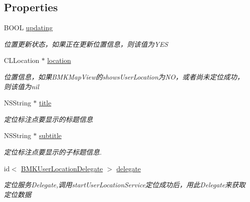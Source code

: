 \subsection*{Properties}
\begin{DoxyCompactItemize}
\item 
\hypertarget{interface_b_m_k_user_location_a57e486ccb3b7665183e9e1eaa4d2716e}{B\-O\-O\-L \hyperlink{interface_b_m_k_user_location_a57e486ccb3b7665183e9e1eaa4d2716e}{updating}}\label{interface_b_m_k_user_location_a57e486ccb3b7665183e9e1eaa4d2716e}

\begin{DoxyCompactList}\small\item\em 位置更新状态，如果正在更新位置信息，则该值为\-Y\-E\-S \end{DoxyCompactList}\item 
\hypertarget{interface_b_m_k_user_location_aba4b76e55f4605c5554fe16aca1b4fbf}{C\-L\-Location $\ast$ \hyperlink{interface_b_m_k_user_location_aba4b76e55f4605c5554fe16aca1b4fbf}{location}}\label{interface_b_m_k_user_location_aba4b76e55f4605c5554fe16aca1b4fbf}

\begin{DoxyCompactList}\small\item\em 位置信息，如果\-B\-M\-K\-Map\-View的shows\-User\-Location为\-N\-O，或者尚未定位成功，则该值为nil \end{DoxyCompactList}\item 
\hypertarget{interface_b_m_k_user_location_a8fc42845ec226a1af2de73c8dd4d183d}{N\-S\-String $\ast$ \hyperlink{interface_b_m_k_user_location_a8fc42845ec226a1af2de73c8dd4d183d}{title}}\label{interface_b_m_k_user_location_a8fc42845ec226a1af2de73c8dd4d183d}

\begin{DoxyCompactList}\small\item\em 定位标注点要显示的标题信息 \end{DoxyCompactList}\item 
\hypertarget{interface_b_m_k_user_location_af38d7aa4f89637da255ca7308fcaa240}{N\-S\-String $\ast$ \hyperlink{interface_b_m_k_user_location_af38d7aa4f89637da255ca7308fcaa240}{subtitle}}\label{interface_b_m_k_user_location_af38d7aa4f89637da255ca7308fcaa240}

\begin{DoxyCompactList}\small\item\em 定位标注点要显示的子标题信息. \end{DoxyCompactList}\item 
\hypertarget{interface_b_m_k_user_location_ae9eee8d2d4760509e448b1f3b90d3a61}{id$<$ \hyperlink{protocol_b_m_k_user_location_delegate-p}{B\-M\-K\-User\-Location\-Delegate} $>$ \hyperlink{interface_b_m_k_user_location_ae9eee8d2d4760509e448b1f3b90d3a61}{delegate}}\label{interface_b_m_k_user_location_ae9eee8d2d4760509e448b1f3b90d3a61}

\begin{DoxyCompactList}\small\item\em 定位服务\-Delegate,调用start\-User\-Location\-Service定位成功后，用此\-Delegate来获取定位数据 \end{DoxyCompactList}\end{DoxyCompactItemize}


